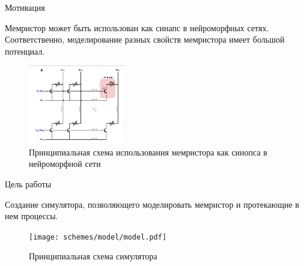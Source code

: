 \documentclass{beamer}%
\begin{document}
\begin{frame}{Мотивация}
\begin{multicols}{2}




Мемристор может быть использован как синапс в нейроморфных сетях.
Соответственно, моделирование разных свойств мемристора имеет большой потенциал.
\columnbreak
    
    \begin{figure}
        \centering
        \includegraphics[width=160px]{img/sinaps-memristor-scheme.jpg}
        \caption{Принципиальная схема использования мемристора как синопса в нейроморфной сети%
        \footnotemark[2]
    }
    \end{figure}
\end{multicols}

\end{frame}


\begin{frame}{Цель работы}

Создание симулятора, позволяющего моделировать мемристор
и протекающие в нем процессы.
\begin{figure}
    \centering
    \texttt{[image: schemes/model/model.pdf]}
    \caption{
        Принципиальная схема симулятора
}
\end{figure}






\end{frame}
\end{document}

